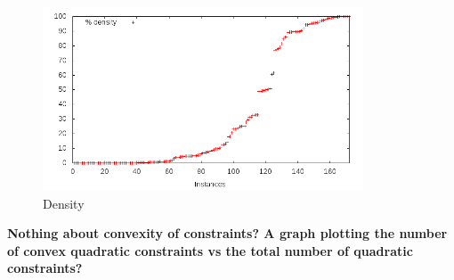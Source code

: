 \begin{figure}\centering
  \includegraphics[width=0.85\textwidth]{pic_density.png}
  \caption{Density \label{fig:pic_density}}
\end{figure}

{\bf Nothing about convexity of constraints? A graph plotting the
number of convex quadratic constraints vs the total number of quadratic
constraints?}

